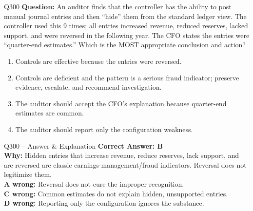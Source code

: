 \documentclass[aspectratio=169,10pt]{beamer}
\begin{document}
	\begin{frame}[t]{Q300}
		\small
		\textbf{Question:} An auditor finds that the controller has the ability to post manual journal entries and then ``hide'' them from the standard ledger view. The controller used this 9 times; all entries increased revenue, reduced reserves, lacked support, and were reversed in the following year. The CFO states the entries were ``quarter-end estimates.'' Which is the MOST appropriate conclusion and action?
		\begin{enumerate}[label=\Alph*.,itemsep=1pt,topsep=2pt]
			\item Controls are effective because the entries were reversed.
			\item Controls are deficient and the pattern is a serious fraud indicator; preserve evidence, escalate, and recommend investigation.
			\item The auditor should accept the CFO's explanation because quarter-end estimates are common.
			\item The auditor should report only the configuration weakness.
		\end{enumerate}
	\end{frame}
	
	\begin{frame}[t]{Q300 -- Answer \& Explanation}
		\small
		\textbf{Correct Answer: B} \\[4pt]
		\textbf{Why:} Hidden entries that increase revenue, reduce reserves, lack support, and are reversed are classic earnings-management/fraud indicators. Reversal does not legitimize them. \\[4pt]
		\textbf{A wrong:} Reversal does not cure the improper recognition. \\[2pt]
		\textbf{C wrong:} Common estimates do not explain hidden, unsupported entries. \\[2pt]
		\textbf{D wrong:} Reporting only the configuration ignores the substance.
	\end{frame}
	
\end{document}
